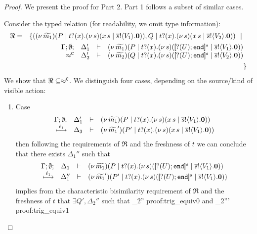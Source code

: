 \begin{proof}
	We present the proof for Part 2. Part 1 follows a subset of similar cases.

	\noi Consider the typed relation (for readability, we omit type information):
	\begin{eqnarray*}
		\Re	&=&		\set{	(\newsp{\widetilde{m_1}}{P \Par \hotrigger{t}{x}{s}{V_1}},
							Q \Par \hotrigger{t}{x}{s}{V_2})
					\setbar\\
			&&			\mhorel{\Gamma}{\Delta_1'}{\newsp{\widetilde{m_1}}{P \Par \fotrigger{t}{x}{s}{\btinp{U} \tinact}{V_1}}}
						{\fwb}
						{\Delta_2'}{}{\newsp{\widetilde{m_2}}{Q \Par \fotrigger{t}{x}{s}{\btinp{U} \tinact}{V_2}}}
			\\
			&&		}
	\end{eqnarray*}
	We show that $\Re \subseteq \approx^\mathtt{C}$. We distinguish four cases, depending on the source/kind of visible action: 
	\begin{enumerate}
		\item	Case
			\[
				\begin{array}{rcll} \Gamma; \emptyset; &\Delta_1'& \vdash& (\nu\, \widetilde{m_1})(P \;|\; t ? (x) . (\nu\, s)(x\, {s} \;|\; \overline{s} ! \langle V_1 \rangle . \mathbf{0}))\\ \stackrel{\ell_1}{\longmapsto} &\Delta_3& \vdash &  (\nu\, \widetilde{m_1}')(P' \;|\; t ? (x) . (\nu\, s)(x\, {s} \;|\; \overline{s} ! \langle V_1 \rangle . \mathbf{0})) \end{array}
			\]
				then following the requirements of $\Re$ and the freshness of $t$
				we can conclude that there exists $\Delta_1''$ such that
			\[
				\mhorel{\Gamma}{\Delta_1}{\newsp{\widetilde{m_1}}{P \Par \fotrigger{t}{x}{s}{\btinp{U} \tinact}{V_1}}}
				{\hby{\ell_1}}
				{\Delta_1''}{}{\newsp{\widetilde{m_1}'}{P' \Par \fotrigger{t}{x}{s}{\btinp{U} \tinact}{V_1}}}
			\]
				implies from the characteristic bisimilarity requirement of $\Re$ and
				the freshness of $t$ that $\exists Q', \Delta_2''$ such that
				{}
				{\Delta_2''}{}
				{proof:trig_equiv0}
				and
				{\fwb}
				{\Delta_2'''}{}
				{proof:trig_equiv1}

\end{enumerate}
\end{proof}
